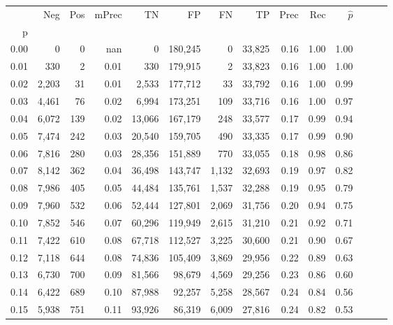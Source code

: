 \begin{tabular}{rrrrrrrrrrrrrr}
\toprule
{} &    Neg &  Pos & mPrec &       TN &       FP &      FN &      TP &  Prec &   Rec & $\hat{p}$ \\
p    &        &      &       &          &          &         &         &       &       &           \\
\midrule
0.00 &      0 &    0 &   nan &        0 &  180,245 &       0 &  33,825 &  0.16 &  1.00 &      1.00 \\
0.01 &    330 &    2 &  0.01 &      330 &  179,915 &       2 &  33,823 &  0.16 &  1.00 &      1.00 \\
0.02 &  2,203 &   31 &  0.01 &    2,533 &  177,712 &      33 &  33,792 &  0.16 &  1.00 &      0.99 \\
0.03 &  4,461 &   76 &  0.02 &    6,994 &  173,251 &     109 &  33,716 &  0.16 &  1.00 &      0.97 \\
0.04 &  6,072 &  139 &  0.02 &   13,066 &  167,179 &     248 &  33,577 &  0.17 &  0.99 &      0.94 \\
0.05 &  7,474 &  242 &  0.03 &   20,540 &  159,705 &     490 &  33,335 &  0.17 &  0.99 &      0.90 \\
0.06 &  7,816 &  280 &  0.03 &   28,356 &  151,889 &     770 &  33,055 &  0.18 &  0.98 &      0.86 \\
0.07 &  8,142 &  362 &  0.04 &   36,498 &  143,747 &   1,132 &  32,693 &  0.19 &  0.97 &      0.82 \\
0.08 &  7,986 &  405 &  0.05 &   44,484 &  135,761 &   1,537 &  32,288 &  0.19 &  0.95 &      0.79 \\
0.09 &  7,960 &  532 &  0.06 &   52,444 &  127,801 &   2,069 &  31,756 &  0.20 &  0.94 &      0.75 \\
0.10 &  7,852 &  546 &  0.07 &   60,296 &  119,949 &   2,615 &  31,210 &  0.21 &  0.92 &      0.71 \\
0.11 &  7,422 &  610 &  0.08 &   67,718 &  112,527 &   3,225 &  30,600 &  0.21 &  0.90 &      0.67 \\
0.12 &  7,118 &  644 &  0.08 &   74,836 &  105,409 &   3,869 &  29,956 &  0.22 &  0.89 &      0.63 \\
0.13 &  6,730 &  700 &  0.09 &   81,566 &   98,679 &   4,569 &  29,256 &  0.23 &  0.86 &      0.60 \\
0.14 &  6,422 &  689 &  0.10 &   87,988 &   92,257 &   5,258 &  28,567 &  0.24 &  0.84 &      0.56 \\
0.15 &  5,938 &  751 &  0.11 &   93,926 &   86,319 &   6,009 &  27,816 &  0.24 &  0.82 &      0.53 \\

\end{tabular}
